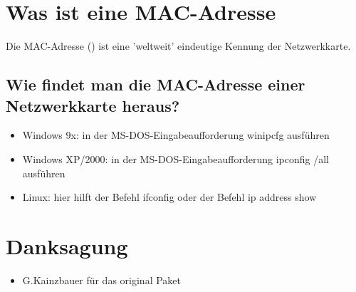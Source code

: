\section {Was ist eine MAC-Adresse}

Die MAC-Adresse () ist eine
'weltweit' eindeutige Kennung der Netzwerkkarte.

\subsection{Wie findet man die MAC-Adresse einer Netzwerkkarte heraus?}
\begin{itemize}
	\item Windows 9x: in der MS-DOS-Eingabeaufforderung \dq{}winipcfg\dq{} ausführen
	\item Windows XP/2000: in der MS-DOS-Eingabeaufforderung \dq{}ipconfig /all\dq{}
	      ausführen
	\item Linux: hier hilft der Befehl \dq{}ifconfig\dq{} oder der Befehl 
	      \dq{}ip address show\dq{}
\end{itemize}

\section {Danksagung}
\begin{itemize}
    \item G.Kainzbauer für das original Paket
\end{itemize}
